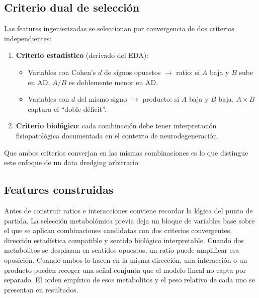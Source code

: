 \subsection{Criterio dual de selección}

Las features ingenierizadas se seleccionan por convergencia de dos criterios independientes:

\begin{enumerate}
    \item \textbf{Criterio estadístico} (derivado del EDA):
    \begin{itemize}
        \item Variables con Cohen's $d$ de signos opuestos $\rightarrow$ ratio: si $A$ baja y $B$ sube en AD, $A/B$ es doblemente menor en AD.
        \item Variables con $d$ del mismo signo $\rightarrow$ producto: si $A$ baja y $B$ baja, $A \times B$ captura el ``doble déficit''.
    \end{itemize}

    \item \textbf{Criterio biológico}: cada combinación debe tener interpretación fisiopatológica documentada en el contexto de neurodegeneración.
\end{enumerate}

Que ambos criterios converjan en las mismas combinaciones es lo que distingue este enfoque de un data dredging arbitrario.

\subsection{Features construidas}

Antes de construir ratios e interacciones conviene recordar la lógica del punto de partida. La selección metabolómica
previa deja un bloque de variables base sobre el que se aplican combinaciones candidatas con dos criterios convergentes,
dirección estadística compatible y sentido biológico interpretable. Cuando dos metabolitos se desplazan en sentidos
opuestos, un ratio puede amplificar esa oposición. Cuando ambos lo hacen en la misma dirección, una interacción o un
producto pueden recoger una señal conjunta que el modelo lineal no capta por separado. El orden empírico de esos
metabolitos y el peso relativo de cada uno se presentan en resultados.

